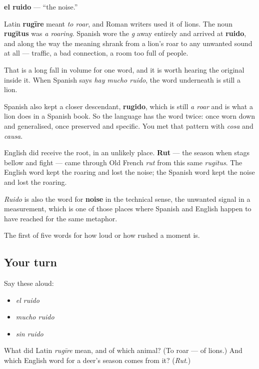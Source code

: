 \begin{cousinweb}
\textbf{el ruido} — \textquotedblleft{}the noise.\textquotedblright{}

Latin \textbf{rugīre} meant \emph{to roar}, and Roman writers used it of lions. The noun \textbf{rugītus} was \emph{a roaring}. Spanish wore the \emph{g} away entirely and arrived at \textbf{ruido}, and along the way the meaning shrank from a lion's roar to any unwanted sound at all — traffic, a bad connection, a room too full of people.

That is a long fall in volume for one word, and it is worth hearing the original inside it. When Spanish says \emph{hay mucho ruido}, the word underneath is still a lion.

Spanish also kept a closer descendant, \textbf{rugido}, which is still \emph{a roar} and is what a lion does in a Spanish book. So the language has the word twice: once worn down and generalised, once preserved and specific. You met that pattern with \emph{cosa} and \emph{causa}.

English did receive the root, in an unlikely place. \textbf{Rut} — the season when stags bellow and fight — came through Old French \emph{rut} from this same \emph{rugītus}. The English word kept the roaring and lost the noise; the Spanish word kept the noise and lost the roaring.

\emph{Ruido} is also the word for \textbf{noise} in the technical sense, the unwanted signal in a measurement, which is one of those places where Spanish and English happen to have reached for the same metaphor.
\end{cousinweb}

\begin{grammarlens}[title={What you've built}]
The first of five words for how loud or how rushed a moment is.
\end{grammarlens}

\subsection*{Your turn}
Say these aloud:

\begin{itemize}
\raggedright
  \item \emph{el ruido}
  \item \emph{mucho ruido}
  \item \emph{sin ruido}
\end{itemize}

\begin{tcolorbox}[breakable,colback=teal!4,colframe=teal!35!black,title={Before you move on}]
What did Latin \emph{rugīre} mean, and of which animal? (To roar — of lions.) And which English word for a deer's season comes from it? (\emph{Rut}.)
\end{tcolorbox}
